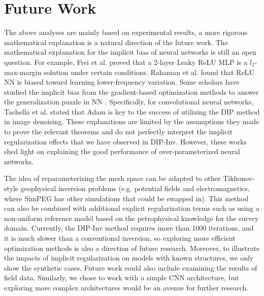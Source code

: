 \documentclass[lettersize,journal]{IEEEtran}
\begin{document}
\section{Future Work}
The above analyses are mainly based on experimental results, a more rigorous mathematical explanation is a natural direction of the future work. The mathematical explanation for the implicit bias of neural networks is still an open question. For example, Frei et al. \cite{ref48} proved that a 2-layer Leaky ReLU MLP is a $l_2$-max-margin solution under certain conditions. Rahaman et al. \cite{ref49} found that ReLU NN is biased toward learning lower-frequency variation. Some scholars have studied the implicit bias from the gradient-based optimization methods to answer the generalization puzzle in NN \cite{ref50}. Specifically, for convolutional neural networks, Tachella et al. \cite{ref61} stated that Adam is key to the success of utilizing the DIP method in image denoising. These explanations are limited by the assumptions they made to prove the relevant theorems and do not perfectly interpret the implicit regularization effects that we have observed in DIP-Inv. However, these works shed light on explaining the good performance of over-parameterized neural networks. 

The idea of reparameterizing the mesh space can be adapted to other Tikhonov-style geophysical inversion problems (e.g. potential fields and electromagnetics, where SimPEG has other simulations that could be swapped in). This method can also be combined with additional explicit regularization terms such as using a non-uniform reference model based on the petrophysical knowledge for the survey domain. Currently, the DIP-Inv method requires more than 1000 iterations, and it is much slower than a conventional inversion, so exploring more efficient optimization methods is also a direction of future research. Moreover, to illustrate the impacts of implicit regularization on models with known structures, we only show the synthetic cases. Future work could also include examining the results of field data. Similarly, we chose to work with a simple CNN architecture, but exploring more complex architectures would be an avenue for further research. 
\end{document}
